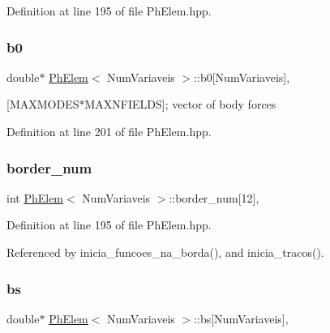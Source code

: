 Definition at line 195 of file Ph\+Elem.\+hpp.

\mbox{\label{classPhElem_aeaebffae27dd713bbc06ad07b7b727a3}} 
\subsubsection{\texorpdfstring{b0}{b0}}
{\footnotesize\ttfamily double$\ast$ \hyperlink{classPhElem}{Ph\+Elem}$<$ Num\+Variaveis $>$\+::b0\mbox{[}Num\+Variaveis\mbox{]}\hspace{0.3cm}{\ttfamily [protected]}, {\ttfamily [inherited]}}



\mbox{[}M\+A\+X\+M\+O\+D\+E\+S$\ast$\+M\+A\+X\+N\+F\+I\+E\+L\+DS\mbox{]}; vector of body forces 



Definition at line 201 of file Ph\+Elem.\+hpp.

\mbox{\label{classPhElem_ad153ce0aef191aac0f28f2addd213c71}} 
\subsubsection{\texorpdfstring{border\+\_\+num}{border\_num}}
{\footnotesize\ttfamily int \hyperlink{classPhElem}{Ph\+Elem}$<$ Num\+Variaveis $>$\+::border\+\_\+num\mbox{[}12\mbox{]}\hspace{0.3cm}{\ttfamily [protected]}, {\ttfamily [inherited]}}



Definition at line 195 of file Ph\+Elem.\+hpp.



Referenced by inicia\+\_\+funcoes\+\_\+na\+\_\+borda(), and inicia\+\_\+tracos().

\mbox{\label{classPhElem_a42b747116ec9223cdebbc424e27f4089}} 
\subsubsection{\texorpdfstring{bs}{bs}}
{\footnotesize\ttfamily double$\ast$ \hyperlink{classPhElem}{Ph\+Elem}$<$ Num\+Variaveis $>$\+::bs\mbox{[}Num\+Variaveis\mbox{]}\hspace{0.3cm}{\ttfamily [protected]}, {\ttfamily [inherited]}}



